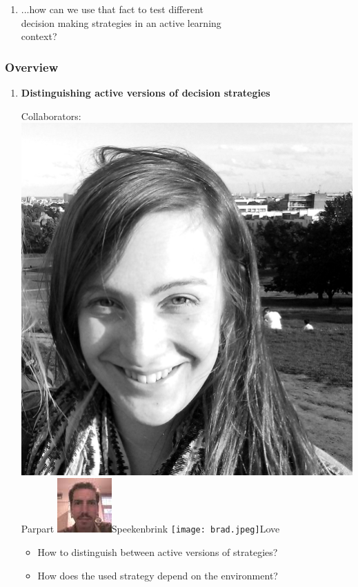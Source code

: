 \documentclass{beamer}
\begin{document}
\begin{frame}
\begin{enumerate}
\item ...how can we use that fact to test different\\ decision making strategies in an active learning\\
context?
\end{enumerate}
\end{frame}


\begin{frame}
 \frametitle{Overview}
 \begin{enumerate}
\item \textbf{Distinguishing active versions of decision strategies}\\
\begin{center}
Collaborators:
\includegraphics[scale=0.013]{paula.jpg}Parpart\hspace{0.2cm}
\includegraphics[scale=0.2]{maarten2.jpg}Speekenbrink\hspace{0.2cm}
\texttt{[image: brad.jpeg]}Love
\end{center}
\begin{itemize}
\item How to distinguish between active versions of strategies?
\item How does the used strategy depend on the environment?
\end{itemize}
\end{enumerate}
\end{frame}
\end{document}
